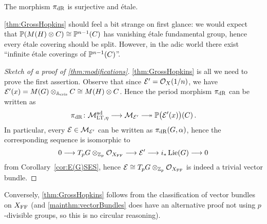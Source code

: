 \documentclass[a4paper, 10pt, oneside, DIV=9, chapterprefix=true, numbers=enddot,bibliography=totoc]{scrbook}
\begin{document}
\begin{thm}\label{thm:GrossHopkins}
	The morphism $\pi_{\mathrm{dR}}$ is surjective and étale.
\end{thm}
\begin{rem}
	\cref{thm:GrossHopkins} should feel a bit strange on first glance: we would expect that $\mathbb{P}(M(H)\otimes C)\cong \mathbb{P}^{n-1}(C)$ has vanishing étale fundamental group, hence every étale covering should be split. However, in the adic world there exist \enquote{infinite étale coverings of $\mathbb{P}^{n-1}(C)$}.
\end{rem}
\begin{proof}[Sketch of a proof of \cref{thm:modifications}]
	\cref{thm:GrossHopkins} is all we need to prove the first assertion. Observe that since $\mathcal{E}'=\mathcal{O}_X(1/n)$, we have $\mathcal{E}'(x)=M(G)\otimes_{\mathbb{A}_{\mathrm{cris}}} C\cong M(H)\otimes C$. Hence the period morphism $\pi_{\mathrm{dR}}$ can be written as
	\begin{equation*}
		\pi_\dR\colon \Mm_{\LT,\eta}^\ad\morphism \Mm_{\Ee'}\epimorphism \IP\big(\Ee'(x)\big)(C)\,.
	\end{equation*}
	In particular, every $\mathcal{E}\in \mathcal{M}_{\mathcal{E}'}$ can be written as $\pi_{\mathrm{dR}}(G,\alpha)$, hence the corresponding sequence is isomorphic to
	\begin{equation*}
		0\morphism T_pG\otimes_{\IZ_p}\Oo_{X_\FFC}\morphism \Ee'\morphism i_*\operatorname{Lie}(G)\morphism 0
	\end{equation*}
	from Corollary~\cref{cor:E(G)SES}, hence $\mathcal{E}\cong T_pG\otimes_{\mathbb{Z}_p}\mathcal{O}_{X_{\mathrm{FF}}}$ is indeed a trivial vector bundle.
\end{proof}
Conversely, \cref{thm:GrossHopkins} follows from the classification of vector bundles on $X_{\mathrm{FF}}$ (and \cref{mainthm:vectorBundles} does have an alternative proof not using $p$-divisible groups, so this is no circular reasoning). 
\end{document}
